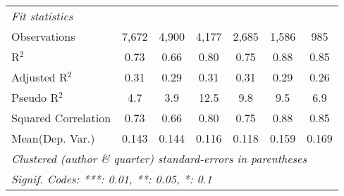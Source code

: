 \begin{tabular}{lcccccc}
   \midrule
   \emph{Fit statistics}\\
   Observations                                               & 7,672        & 4,900        & 4,177        & 2,685        & 1,586   & 985\\  
   R$^2$                                                      & 0.73         & 0.66         & 0.80         & 0.75         & 0.88    & 0.85\\  
   Adjusted R$^2$                                             & 0.31         & 0.29         & 0.31         & 0.31         & 0.29    & 0.26\\  
   Pseudo R$^2$                                               & 4.7          & 3.9          & 12.5         & 9.8          & 9.5     & 6.9\\  
   Squared Correlation                                        & 0.73         & 0.66         & 0.80         & 0.75         & 0.88    & 0.85\\  
Mean(Dep. Var.) & 0.143 & 0.144 & 0.116 & 0.118 & 0.159 & 0.169 \\
   \midrule \midrule
   \multicolumn{7}{l}{\emph{Clustered (author \& quarter) standard-errors in parentheses}}\\
   \multicolumn{7}{l}{\emph{Signif. Codes: ***: 0.01, **: 0.05, *: 0.1}}\\
\end{tabular}
\par\endgroup

